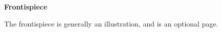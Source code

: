 
\centerline{\textbf{Frontispiece}}
\vspace*{4\baselineskip}
The frontispiece is generally an illustration, and is an optional page.